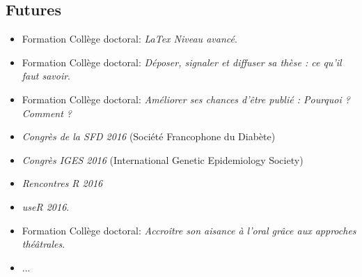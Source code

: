 \documentclass[11pt, a4paper]{article}
\begin{document}
\subsection{Futures}
\par{
\begin{itemize}
    \item Formation Collège doctoral: \textit{LaTex Niveau avancé}.
    \item Formation Collège doctoral: \textit{Déposer, signaler et diffuser sa thèse : ce qu'il faut savoir}.
    \item Formation Collège doctoral: \textit{Améliorer ses chances d'être publié : Pourquoi ? Comment ?}
    \item \textit{Congrès de la SFD 2016} (Société Francophone du Diabète)
    \item \textit{Congrès IGES 2016} (International Genetic Epidemiology Society)
    \item \textit{Rencontres R 2016}
    \item \textit{useR 2016}.
    \item Formation Collège doctoral: \textit{Accroître son aisance à l'oral grâce aux approches théâtrales}.
    \item ...
\end{itemize}
}



\clearpage
{}




\end{document}
